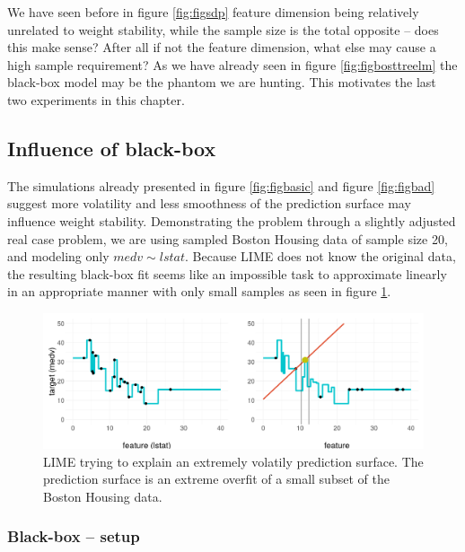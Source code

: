 \documentclass[]{krantz}
\begin{document}
We have seen before in figure \ref{fig:figsdp} feature dimension being
relatively unrelated to weight stability, while the sample size is the
total opposite -- does this make sense? After all if not the feature
dimension, what else may cause a high sample requirement? As we have
already seen in figure \ref{fig:figbosttreelm} the black-box model may
be the phantom we are hunting. This motivates the last two experiments
in this chapter.

\subsection{Influence of black-box}\label{influence-of-black-box}

The simulations already presented in figure \ref{fig:figbasic} and
figure \ref{fig:figbad} suggest more volatility and less smoothness of
the prediction surface may influence weight stability. Demonstrating the
problem through a slightly adjusted real case problem, we are using
sampled Boston Housing data of sample size 20, and modeling only
\(medv \sim lstat\). Because LIME does not know the original data, the
resulting black-box fit seems like an impossible task to approximate
linearly in an appropriate manner with only small samples as seen in
figure \ref{fig:figverybad}.

\begin{figure}

{\centering \includegraphics[width=0.99\linewidth]{images/boston_sampled_tree_presi3} 

}

\caption{LIME trying to explain an extremely volatily prediction surface. The prediction surface is an extreme overfit of a small subset of the Boston Housing data.}\label{fig:figverybad}
\end{figure}

\subsubsection{Black-box -- setup}\label{black-box-setup}
\end{document}
